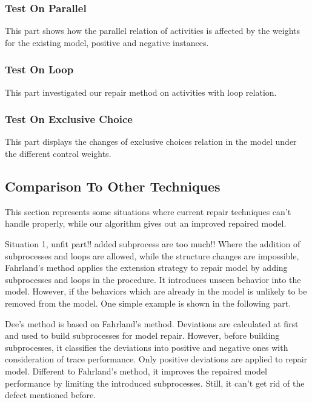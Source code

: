 \subsubsection{Test On Parallel}
This part shows how the parallel relation of activities is affected by the weights for the existing model, positive and negative instances.

\subsubsection{Test On Loop}
This part investigated our repair method on activities with loop relation.

\subsubsection{Test On Exclusive Choice}
This part displays the changes of exclusive choices relation in the model under the different control weights.

\subsection{Comparison To Other Techniques}
This section represents some situations where current repair techniques can't handle properly, while our algorithm gives out an improved repaired model. 

Situation 1, unfit part!! added subprocess are too much!! Where the addition of subprocesses and loops are allowed, while the structure changes are impossible, 
Fahrland's method applies the extension strategy to repair model by adding subprocesses and loops in the procedure. It introduces unseen behavior into the model. However, if the behaviors which are already in the model is unlikely to be removed from the model. One simple example is shown in the following part. 

Dee's method is based on Fahrland's method. Deviations are calculated at first and used to build subprocesses for model repair. However, before building subprocesses, it classifies the deviations into positive and negative ones with consideration of trace performance. Only positive deviations are applied to repair model. Different to Fahrland's method, it improves the repaired model performance by limiting the introduced subprocesses. Still, it can't get rid of the defect mentioned before. 

